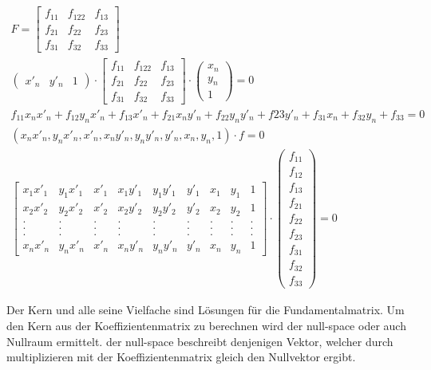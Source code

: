 \begin{gather}
F=\begin{bmatrix}
f_{11}&f_{122}&f_{13}\\
f_{21}&f_{22}&f_{23}\\
f_{31}&f_{32}&f_{33}
\end{bmatrix}\\
\begin{pmatrix}
x'_n&y'_n&1
\end{pmatrix} 
\cdot
\begin{bmatrix}
f_{11}&f_{122}&f_{13}\\
f_{21}&f_{22}&f_{23}\\
f_{31}&f_{32}&f_{33}
\end{bmatrix}
\cdot
\begin{pmatrix}
x_n\\y_n\\1
\end{pmatrix} =0\\
f_{11}x_nx'_n+f_{12}y_nx'_n+f_{13}x'_n+f_{21}x_ny'_n+f_{22}y_ny'_n+f{23}y'_n+f_{31}x_n+f_{32}y_n+f_{33} =0\\
(x_nx'_n,y_nx'_n,x'_n,x_ny'_n,y_ny'_n,y'_n,x_n,y_n,1)\cdot f =0\\
\begin{bmatrix}
x_1x'_1&y_1x'_1&x'_1&x_1y'_1&y_1y'_1&y'_1&x_1&y_1&1\\
x_2x'_2&y_2x'_2&x'_2&x_2y'_2&y_2y'_2&y'_2&x_2&y_2&1\\
.&.&.&.&.&.&.&.&.\\
.&.&.&.&.&.&.&.&.\\
.&.&.&.&.&.&.&.&.\\
x_nx'_n&y_nx'_n&x'_n&x_ny'_n&y_ny'_n&y'_n&x_n&y_n&1
\end{bmatrix}
\cdot 
\begin{pmatrix}
f_{11}\\f_{12}\\f_{13}\\f_{21}\\f_{22}\\f_{23}\\f_{31}\\f_{32}\\f_{33}
\end{pmatrix}
= 0
\end{gather}

Der Kern und alle seine Vielfache sind Lösungen für die Fundamentalmatrix. Um den Kern aus der Koeffizientenmatrix zu berechnen wird der null-space oder auch Nullraum ermittelt. der null-space beschreibt denjenigen Vektor, welcher durch multiplizieren mit der Koeffizientenmatrix gleich den Nullvektor ergibt.

